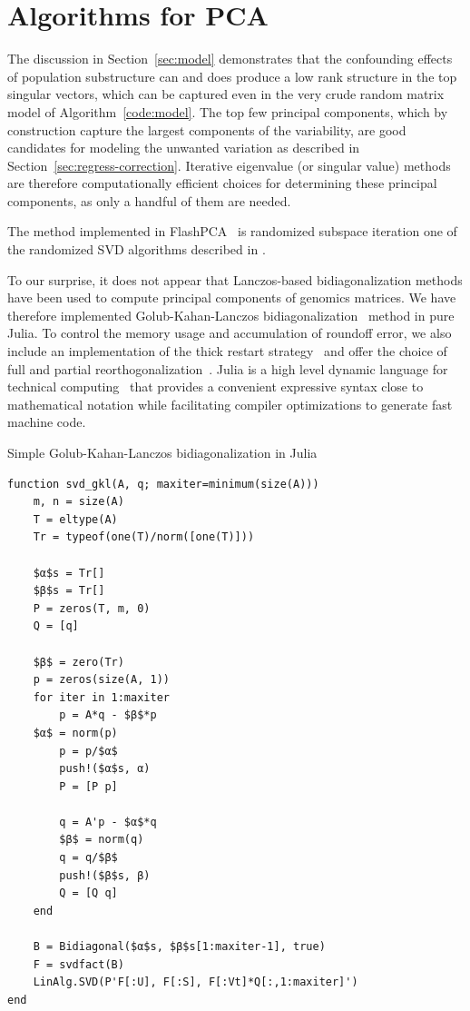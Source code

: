 \documentclass[review]{siamart0516}
\begin{document}
\section{Algorithms for PCA}

The discussion in Section~\ref{sec:model} demonstrates that the confounding
effects of population substructure can and does produce a low rank structure in
the top singular vectors, which can be captured even in the very crude random
matrix model of Algorithm~\ref{code:model}. The top few principal components,
which by construction capture the largest components of the variability, are
good candidates for modeling the unwanted variation as described in
Section~\ref{sec:regress-correction}. Iterative eigenvalue (or singular value)
methods~\cite{Bai2000} are therefore computationally efficient choices for
determining these principal components, as only a handful of them are needed.

The method implemented in FlashPCA~\cite{abraham2014fast} is randomized
subspace iteration one of the randomized SVD algorithms described in
\cite{halko2011finding}.

To our surprise, it does not appear that Lanczos-based bidiagonalization
methods have been used to compute principal components of genomics matrices.
We have therefore implemented Golub-Kahan-Lanczos bidiagonalization~\cite{Golub1965}
method in pure Julia. To control the memory usage and accumulation of
roundoff error, we also include an implementation of the thick restart
strategy~\cite{Stewart2001,Baglama2005} and offer the choice of full and
partial reorthogonalization~\cite{Simon1984,Larsen1998}.
Julia is a high level dynamic language for technical computing~\cite{Bezanson2012,Bezanson2015}
that provides a convenient expressive syntax close to mathematical
notation while facilitating compiler optimizations to generate fast machine
code.

\begin{algorithm}
\caption{Simple Golub-Kahan-Lanczos bidiagonalization in Julia}

\begin{lstlisting}
function svd_gkl(A, q; maxiter=minimum(size(A)))
    m, n = size(A)
    T = eltype(A)
    Tr = typeof(one(T)/norm([one(T)]))

    $α$s = Tr[]
    $β$s = Tr[]
    P = zeros(T, m, 0)
    Q = [q]

    $β$ = zero(Tr)
    p = zeros(size(A, 1))
    for iter in 1:maxiter
        p = A*q - $β$*p
	$α$ = norm(p)
        p = p/$α$
        push!($α$s, α)
        P = [P p]

        q = A'p - $α$*q
        $β$ = norm(q)
        q = q/$β$
        push!($β$s, β)
        Q = [Q q]
    end

    B = Bidiagonal($α$s, $β$s[1:maxiter-1], true)
    F = svdfact(B)
    LinAlg.SVD(P'F[:U], F[:S], F[:Vt]*Q[:,1:maxiter]')
end
\end{lstlisting}
\end{algorithm}
\end{document}
